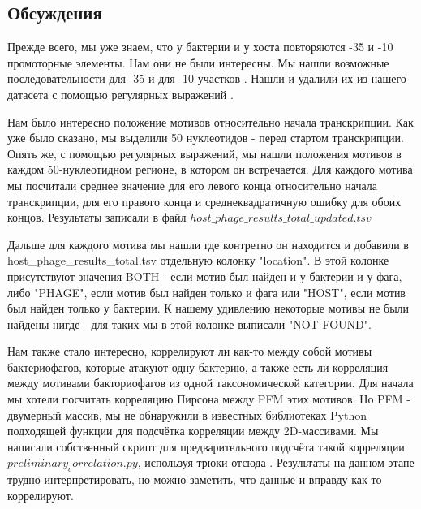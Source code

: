 \documentclass[14pt]{extarticle}
\begin{document}
\begin{center}
\item \subsection{Обсуждения}
\end{center}

    \par{Прежде всего, мы уже знаем, что у бактерии и у хоста повторяются -35 и -10 промоторные элементы. Нам они не
    были интересны. Мы нашли возможные последовательности для -35 и для -10 участков \cite{-35,-10,-35-10,-35-10wiki}.
    Нашли и удалили их из нашего датасета с помощью регулярных выражений \cite{re}. }
    
    \par{Нам было интересно положение мотивов относительно начала транскрипции. Как уже было сказано, мы выделили 50 
    нуклеотидов - перед стартом транскрипции. Опять же, с помощью регулярных выражений, мы нашли положения мотивов в
    каждом 50-нуклеотидном регионе, в котором он встречается. Для каждого мотива мы посчитали среднее значение для его
    левого конца относительно начала транскрипции, для его правого конца и среднеквадратичную ошибку для обоих
    концов. Результаты записали в файл $ host\_phage\_results\_total\_updated.tsv $}
    
    \par{Дальше для каждого мотива мы нашли где контретно он находится и добавили в host\_phage\_results\_total.tsv
    отдельную колонку "location". В этой колонке присутствуют значения BOTH - если мотив был найден и у бактерии и у
    фага, либо "PHAGE", если мотив был найден только и фага или "HOST", если мотив был найден только у бактерии. К
    нашему удивлению некоторые мотивы не были найдены нигде - для таких мы в этой колонке выписали "NOT FOUND".}
    
    \par{Нам также стало интересно, коррелируют ли как-то между собой мотивы бактериофагов, которые атакуют одну 
    бактерию, а также есть ли корреляция между мотивами бакториофагов из одной таксономической категории. Для начала мы 
    хотели посчитать корреляцию Пирсона между PFM этих мотивов. Но PFM - двумерный массив, мы не обнаружили в известных 
    библиотеках Python подходящей функции для подсчётка корреляции между 2D-массивами. Мы написали собственный скрипт 
    для предварительного подсчёта такой корреляции $preliminary_correlation.py$, используя трюки отсюда 
    \cite{stackoverflow}. Результаты на данном этапе трудно интерпретировать, но можно заметить, что данные и вправду 
    как-то коррелируют.}
    
\end{document}
